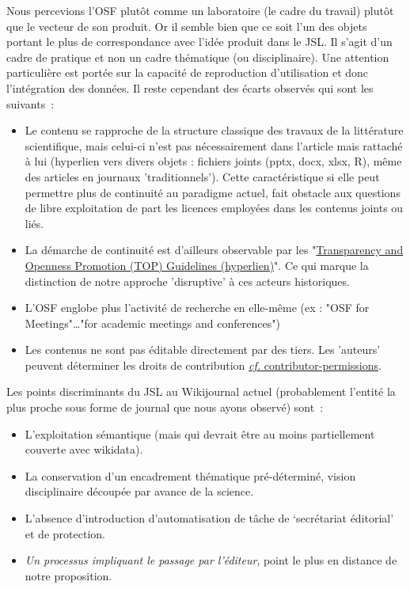 Nous percevions l'\gls{OSF} plutôt comme un laboratoire (le cadre du travail) plutôt que le vecteur de son produit.
Or il semble bien que ce soit l'un des objets portant le plus de correspondance avec l'idée produit dans le \gls{JSL}.
Il s'agit d'un cadre de pratique et non un cadre thématique (ou disciplinaire).
Une attention particulière est portée sur la capacité de reproduction d'utilisation et donc l'intégration des données.
Il reste cependant des écarts observés qui sont les suivants~:
\begin{itemize}
\item Le contenu se rapproche de la structure classique des travaux de la littérature scientifique, mais celui-ci n'est pas nécessairement dans l'article mais rattaché à lui (hyperlien vers divers objets : fichiers joints (pptx, docx, xlsx, R), même des articles en journaux 'traditionnels'). Cette caractéristique si elle peut permettre plus de continuité au paradigme actuel, fait obstacle aux questions de libre exploitation de part les licences employées dans les contenus joints ou liés.
\item La démarche de continuité est d'ailleurs observable par les "\href{https://cos.io/top/}{Transparency and Openness Promotion (TOP) Guidelines (hyperlien)}". Ce qui marque la distinction de notre approche 'disruptive' à ces acteurs historiques.
\item L'\gls{OSF} englobe plus l'activité de recherche en elle-même (ex : "OSF for Meetings"\ldots "for academic meetings and conferences")
\item Les contenus ne sont pas éditable directement par des tiers. Les 'auteurs' peuvent déterminer les droits de contribution \href{http://help.osf.io/m/sharing/l/526695-contributor-permissions}{\textit{cf.} contributor-permissions}.
\end{itemize}

Les points discriminants du \gls{JSL} au Wikijournal actuel (probablement l'entité la plus proche sous forme de journal que nous ayons observé) sont~:
\begin{itemize}
\item L'exploitation sémantique (mais qui devrait être au moins partiellement couverte avec wikidata).
\item La conservation d'un encadrement thématique pré-déterminé, vision disciplinaire découpée par avance de la science.
\item L'absence d'introduction d'automatisation de tâche de `secrétariat éditorial' et de protection.
\item \textit{Un processus impliquant le passage par l'éditeur}, point le plus en distance de notre proposition.
\end{itemize}


